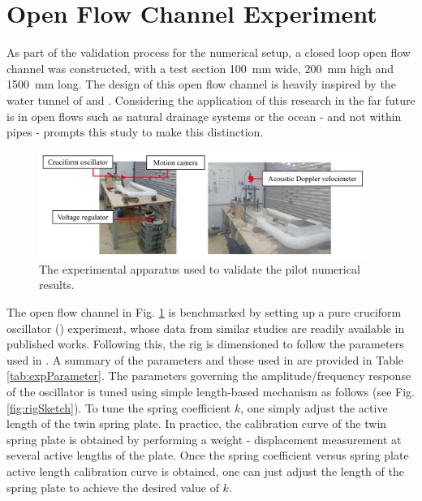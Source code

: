 \documentclass[oneside]{utmthesis}
\begin{document}
\section{Open Flow Channel Experiment} \label{sec:openFlowExp}

\vspace{\baselineskip}

As part of the validation process for the numerical setup, a closed loop open flow channel was constructed, with a test section \SI{100}{\milli\metre} wide, \SI{200}{\milli\metre} high and \SI{1500}{\milli\metre} long. The design of this open flow channel is heavily inspired by the water tunnel of \citet{Nguyen2012} and \citet{Koide2013}. Considering the application of this research in the far future is in open flows such as natural drainage systems or the ocean - and not within pipes - prompts this study to make this distinction.

\begin{figure}[!h]
  \centering
  \hspace{1cm} \includegraphics[width=0.95\textwidth]{figs/actualApparatus}
  \caption{The experimental apparatus used to validate the pilot numerical results.}
  \label{fig:actual apparatus}
\end{figure}

The open flow channel in Fig. \ref{fig:actual apparatus} is benchmarked by setting up a pure cruciform oscillator (\angfi{}) experiment, whose data from similar studies are readily available in published works. Following this, the rig is dimensioned to follow the parameters used in \citet{Koide2013}. A summary of the parameters and those used in \citet{Koide2013} are provided in Table \ref{tab:expParameter}. The parameters governing the amplitude/frequency response of the oscillator is tuned using simple length-based mechanism as follows (see Fig. \ref{fig:rigSketch}). To tune the spring coefficient $k$, one simply adjust the active length of the twin spring plate. In practice, the calibration curve of the twin spring plate is obtained by performing a weight - displacement measurement \citep{Sun2016} at several active lengths of the plate. Once the spring coefficient versus spring plate active length calibration curve is obtained, one can just adjust the length of the spring plate to achieve the desired value of $k$.
\end{document}
